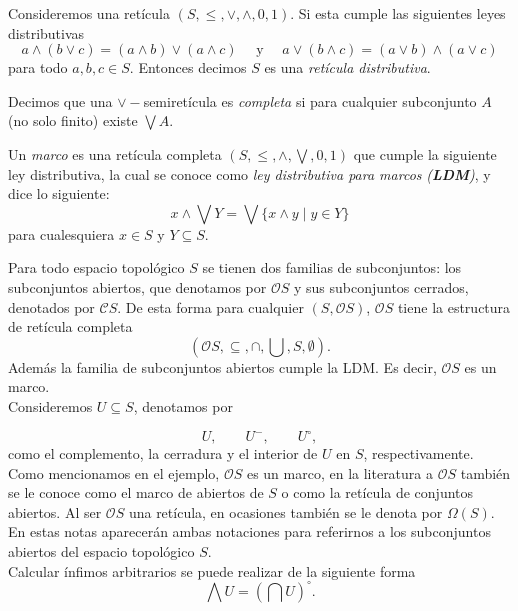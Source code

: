 \begin{dfn}\label{Reticuladistributiva}
Consideremos una retícula $(S, \leq, \vee, \wedge, 0, 1)$. Si esta  cumple las siguientes leyes distributivas
\[
a\wedge (b\vee c)=(a\wedge b)\vee (a\wedge c)\quad\mbox{ y }\quad a\vee (b\wedge c)=(a\vee b)\wedge (a\vee c)
\]
para todo $a, b, c\in S$. Entonces decimos $S$ es una \emph{retícula distributiva}.
\end{dfn}

\begin{dfn}\label{Semiretículacompleta}
Decimos que una $\vee-$semiretícula es \emph{completa} si para cualquier subconjunto $A$ (no solo finito) existe $\bigvee A$. 
\end{dfn}

\begin{dfn}\label{frm}
Un \emph{marco} es una retícula completa $(S, \leq, \wedge, \bigvee, 0, 1)$ que cumple la siguiente ley distributiva, la cual se conoce como  \emph{ley distributiva para marcos} \emph{(\textbf{LDM})}, y dice lo siguiente:
\[
x\wedge\bigvee Y=\bigvee\{x\wedge y\mid y\in Y\}
\]
para cualesquiera $x\in S$ y $Y\subseteq S$.
\end{dfn}

\begin{ej}\label{ejem1}
Para todo espacio topológico $S$ se tienen dos familias de subconjuntos: los subconjuntos abiertos, que denotamos por $\mathcal{O}S$ y sus subconjuntos cerrados, denotados por $\mathcal{C}S$. De esta forma para cualquier $(S,\mathcal{O}S)$, $\mathcal{O}S$ tiene la estructura  de retícula completa $$(\mathcal{O}S, \subseteq, \cap,\bigcup, S,\emptyset).$$
Además la familia de subconjuntos abiertos cumple la LDM. Es decir, $\mathcal{O}S$ es un marco.\\

Consideremos $U\subseteq S$, denotamos por

\[
U,\qquad U^-,\qquad U^\circ,
\]
como el complemento, la cerradura y el interior de $U$ en $S$, respectivamente.\\ 

Como mencionamos en el ejemplo, $\mathcal{O}S$ es un marco, en la literatura a $\mathcal{O}S$ también se le conoce como el marco de abiertos de $S$ o como la retícula de conjuntos abiertos. Al ser $\mathcal{O}S$ una retícula, en ocasiones también se le denota por $\Omega(S)$. En estas notas aparecerán ambas notaciones para referirnos a los subconjuntos abiertos del espacio topológico $S$.\\

Calcular ínfimos arbitrarios se puede realizar de la siguiente forma 
\[
\bigwedge U=\left(\bigcap U\right)^\circ.
\]
\end{ej}

